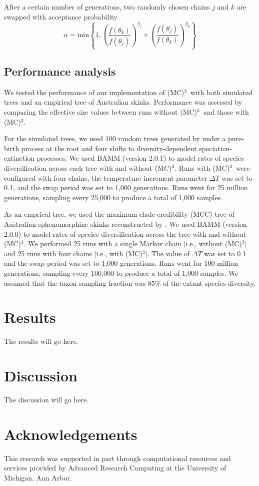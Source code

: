 \documentclass[12pt]{article}
\newcommand{\MCMCMC}{(MC)$^{3}$}
\begin{document}
After a certain number of generations, two randomly chosen chains $j$ and $k$
are swapped with acceptance probability
\[\alpha = \text{min}\left\{ 1,
    \left(\frac{f(\theta_k)}{f(\theta_j)}\right)^{\beta_j} \times
    \left(\frac{f(\theta_j)}{f(\theta_k)}\right)^{\beta_k}
\right\}\]


\subsection*{Performance analysis}

We tested the performance of our implementation of \MCMCMC\ 
with both simulated trees and an empirical tree of Australian skinks.
%
Performance was assessed by comparing the effective size values
between runs without \MCMCMC\ and those with \MCMCMC.


For the simulated trees, we used 100 random trees generated by \citet{rab14plos}
under a pure-birth process at the root and four shifts
to diversity-dependent speciation-extinction processes.
%
We used BAMM (version 2.0.1) to model rates of species diversification
across each tree with and without \MCMCMC.
%
Runs with \MCMCMC\ were configured with four chains,
the temperature increment parameter $\Delta T$ was set to 0.1,
and the swap period was set to 1,000 generations.
%
Runs went for 25 million generations,
sampling every 25,000 to produce a total of 1,000 samples.


As an emprical tree, we used the maximum clade credibility (MCC) tree
of Australian sphenomorphine skinks reconstructed by \citet{rab14sysbio}.
%
We used BAMM (version 2.0.0) to model rates of species diversification
across the tree with and without \MCMCMC.
%
We performed 25 runs with a single Markov chain [i.e., without \MCMCMC]
and 25 runs with four chains [i.e., with \MCMCMC].
%
The value of $\Delta T$ was set to 0.1
and the swap period was set to 1,000 generations.
%
Runs went for 100 million generations,
sampling every 100,000 to produce a total of 1,000 samples.
%
We assumed that the taxon sampling fraction was 85\%
of the extant species diversity.


\section*{Results}

The results will go here.


\section*{Discussion}

The discussion will go here.


\section*{Acknowledgements}

This research was supported in part through computational resources
and services provided by Advanced Research Computing
at the University of Michigan, Ann Arbor.



\end{document}
